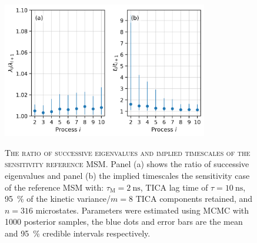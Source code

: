 

\begin{figure}[ht!]
 \centering
 \caption[The ratio of successive eigenvalues and implied timescales of the sensitivity reference MSM]{\textsc{The ratio of successive eigenvalues and implied timescales of the sensitivity reference MSM}. Panel (a) shows the ratio of successive eigenvalues and panel (b) the implied timescales the sensitivity case of the reference MSM with: $\tau_{\mathrm{M}}=\SI{2}{\nano\second}$, TICA lag time of $\tau=\SI{10}{\nano\second}$, \SI{95}{\percent} of the kinetic variance/$m=8$ TICA components retained, and $n=316$ microstates. Parameters were estimated using MCMC with \num{1000} posterior samples, the blue dots and error bars are the mean and \SI{95}{\percent} credible intervals respectively.}
 \includegraphics[width=0.8\textwidth]{chapters/aadh/figures/timescale_ratios_D_sens.png}
 \label{fig:ts_ratios_d_sens}
\end{figure}

